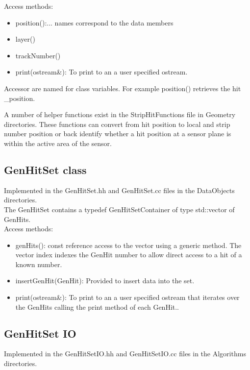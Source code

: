 \documentclass[aps,prd,superscriptaddress,floatfix]{revtex4}
\begin{document}
Access methods:
\begin{itemize}
\item position():... names correspond to the data members
\item layer()
\item trackNumber()
\item print(ostream\&): To print to an a user specified ostream.
\end{itemize}

Accessor are named for class variables.  For example position()
retrieves the hit \_position. 

A number of helper functions exist in the StripHitFunctions file in Geometry directories.  These functions
can convert from hit position to local and strip number position or back identify whether a hit position at a sensor
plane is within the active area of the sensor.


\subsection{GenHitSet class}
Implemented in the GenHitSet.hh and GenHitSet.cc files in the DataObjects directories.
\\

The GenHitSet contains a typedef GenHitSetContainer of type std::vector of GenHits.
\\

Access methods:

\begin{itemize}
\item genHits(): const reference access to the vector using a generic method.
The vector index indexes the GenHit number to allow direct access to a hit of a known number.

\item insertGenHit(GenHit): Provided to insert data into the set.

\item print(ostream\&): To print to an a user specified ostream that iterates over
the GenHits calling the print method of each GenHit..
\end{itemize}

\subsection{GenHitSet IO}
Implemented in the GenHitSetIO.hh and GenHitSetIO.cc files in the Algorithms directories.
\\
\end{document}
